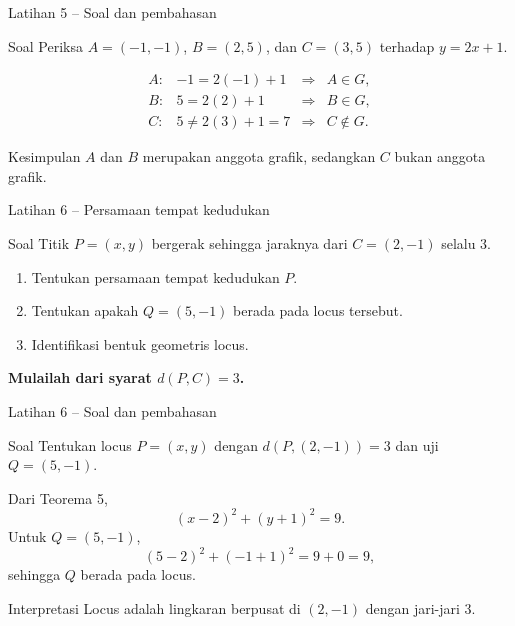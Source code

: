 \documentclass[aspectratio=169,11pt]{beamer}
\begin{document}
\begin{frame}{Latihan 5 -- Soal dan pembahasan}
    \begin{exampleblock}{Soal}
        Periksa $A=(-1,-1)$, $B=(2,5)$, dan $C=(3,5)$ terhadap $y=2x+1$.
    \end{exampleblock}

    \[
    \begin{array}{rcll}
        A: & -1=2(-1)+1 & \Longrightarrow & A\in G,\\[1mm]
        B: & 5=2(2)+1   & \Longrightarrow & B\in G,\\[1mm]
        C: & 5\ne2(3)+1=7 & \Longrightarrow & C\notin G.
    \end{array}
    \]

    \begin{exampleblock}{Kesimpulan}
        $A$ dan $B$ merupakan anggota grafik, sedangkan $C$ bukan anggota grafik.
    \end{exampleblock}
\end{frame}

\begin{frame}{Latihan 6 -- Persamaan tempat kedudukan}
    \begin{block}{Soal}
        Titik $P=(x,y)$ bergerak sehingga jaraknya dari $C=(2,-1)$ selalu $3$.
        \begin{enumerate}
            \item Tentukan persamaan tempat kedudukan $P$.
            \item Tentukan apakah $Q=(5,-1)$ berada pada locus tersebut.
            \item Identifikasi bentuk geometris locus.
        \end{enumerate}
    \end{block}
    \vspace{0.30cm}
    \centering
    \color{AcademicBlue}\bfseries Mulailah dari syarat $d(P,C)=3$.
\end{frame}

\begin{frame}{Latihan 6 -- Soal dan pembahasan}
    \begin{exampleblock}{Soal}
        Tentukan locus $P=(x,y)$ dengan $d(P,(2,-1))=3$ dan uji $Q=(5,-1)$.
    \end{exampleblock}

    Dari Teorema 5,
    \[
        \boxed{(x-2)^2+(y+1)^2=9}.
    \]
    Untuk $Q=(5,-1)$,
    \[
        (5-2)^2+(-1+1)^2=9+0=9,
    \]
    sehingga $Q$ berada pada locus.

    \begin{exampleblock}{Interpretasi}
        Locus adalah lingkaran berpusat di $(2,-1)$ dengan jari-jari $3$.
    \end{exampleblock}
\end{frame}
\end{document}
